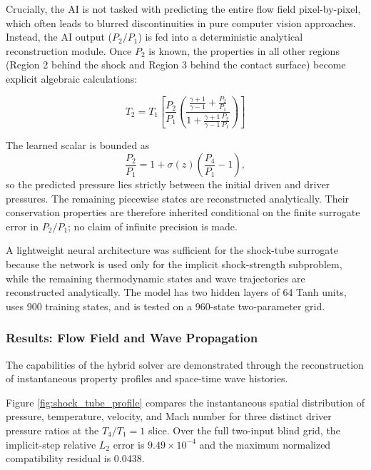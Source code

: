 \documentclass[preprint,12pt]{elsarticle}
\newcommand{\rev}[1]{#1}
\newenvironment{revision}{}{}
\newcommand{\rev}[1]{\textcolor{revisionblue}{#1}}
\newenvironment{revision}{\color{revisionblue}}{}
\begin{document}
Crucially, the AI is not tasked with predicting the entire flow field pixel-by-pixel, which often leads to blurred discontinuities in pure computer vision approaches. Instead, the AI output ($P_2/P_1$) is fed into a deterministic analytical reconstruction module. Once $P_2$ is known, the properties in all other regions (Region 2 behind the shock and Region 3 behind the contact surface) become explicit algebraic calculations:

\begin{equation}
    T_2 = T_1 \left[ \frac{P_2}{P_1} \left( \frac{\frac{\gamma+1}{\gamma-1} + \frac{P_2}{P_1}}{1 + \frac{\gamma+1}{\gamma-1} \frac{P_2}{P_1}} \right) \right]
    \label{eq:temp_ratio}
\end{equation}

\begin{revision}
The learned scalar is bounded as
\begin{equation}
\frac{P_2}{P_1}=1+\sigma(z)\left(\frac{P_4}{P_1}-1\right),
\label{eq:shocktube_bound}
\end{equation}
so the predicted pressure lies strictly between the initial driven and driver pressures. The remaining piecewise states are reconstructed analytically. Their conservation properties are therefore inherited conditional on the finite surrogate error in $P_2/P_1$; no claim of infinite precision is made.
\end{revision}

A lightweight neural architecture was sufficient for the shock-tube surrogate because the network is used only for the implicit shock-strength subproblem, while the remaining thermodynamic states and wave trajectories are reconstructed analytically. \rev{The model has two hidden layers of 64 Tanh units, uses 900 training states, and is tested on a 960-state two-parameter grid.}




\subsubsection{Results: Flow Field and Wave Propagation}

The capabilities of the hybrid solver are demonstrated through the reconstruction of instantaneous property profiles and space-time wave histories.


Figure \ref{fig:shock_tube_profile} compares the instantaneous spatial distribution of pressure, temperature, velocity, and Mach number for three distinct driver pressure ratios at the $T_4/T_1=1$ slice. \rev{Over the full two-input blind grid, the implicit-step relative $L_2$ error is $9.49\times10^{-4}$ and the maximum normalized compatibility residual is 0.0438.}
\end{document}
